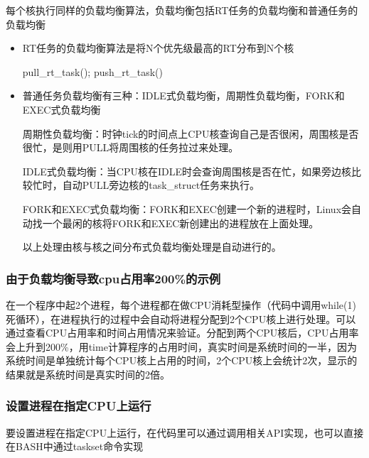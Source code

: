 每个核执行同样的负载均衡算法，负载均衡包括RT任务的负载均衡和普通任务的负载均衡

\begin{itemize}
\item
  RT任务的负载均衡算法是将N个优先级最高的RT分布到N个核

  pull\_rt\_task(); push\_rt\_task()
\item
  普通任务负载均衡有三种：IDLE式负载均衡，周期性负载均衡，FORK和EXEC式负载均衡

  周期性负载均衡：时钟tick的时间点上CPU核查询自己是否很闲，周围核是否很忙，是则用PULL将周围核的任务拉过来处理。

  IDLE式负载均衡：当CPU核在IDLE时会查询周围核是否在忙，如果旁边核比较忙时，自动PULL旁边核的task\_struct任务来执行。

  FORK和EXEC式负载均衡：FORK和EXEC创建一个新的进程时，Linux会自动找一个最闲的核将FORK和EXEC新创建出的进程放在上面处理。

  以上处理由核与核之间分布式负载均衡处理是自动进行的。
\end{itemize}

\hypertarget{header-n79}{%
\subsubsection{由于负载均衡导致cpu占用率200\%的示例}\label{header-n79}}

在一个程序中起2个进程，每个进程都在做CPU消耗型操作（代码中调用while(1)死循环），在进程执行的过程中会自动将进程分配到2个CPU核上进行处理。可以通过查看CPU占用率和时间占用情况来验证。分配到两个CPU核后，CPU占用率会上升到200\%，用time计算程序的占用时间，真实时间是系统时间的一半，因为系统时间是单独统计每个CPU核上占用的时间，2个CPU核上会统计2次，显示的结果就是系统时间是真实时间的2倍。

\hypertarget{header-n82}{%
\subsubsection{设置进程在指定CPU上运行}\label{header-n82}}

要设置进程在指定CPU上运行，在代码里可以通过调用相关API实现，也可以直接在BASH中通过taskset命令实现

\begin{Shaded}
\begin{Highlighting}[]
\PreprocessorTok{ }
\end{Highlighting}
\end{Shaded}

